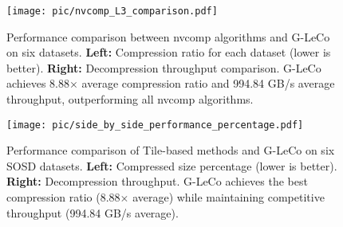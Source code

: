 %

\begin{figure}[htbp]
    \centering
    \texttt{[image: pic/nvcomp\_L3\_comparison.pdf]}
    \caption{Performance comparison between nvcomp algorithms and G-LeCo on six datasets.
    \textbf{Left:} Compression ratio for each dataset (lower is better).
    \textbf{Right:} Decompression throughput comparison. G-LeCo achieves 8.88$\times$ average
    compression ratio and 994.84 GB/s average throughput, outperforming all nvcomp algorithms.}
    \label{fig:nvcomp_L3_comparison}
\end{figure}






\begin{figure}[htbp]
    \centering
    \texttt{[image: pic/side\_by\_side\_performance\_percentage.pdf]}
    \caption{Performance comparison of Tile-based methods and G-LeCo on six SOSD datasets.
    \textbf{Left:} Compressed size percentage (lower is better).
    \textbf{Right:} Decompression throughput. G-LeCo achieves the best compression ratio
    (8.88$\times$ average) while maintaining competitive throughput (994.84 GB/s average).}
    \label{fig:tile_L3_comparison}
\end{figure}

